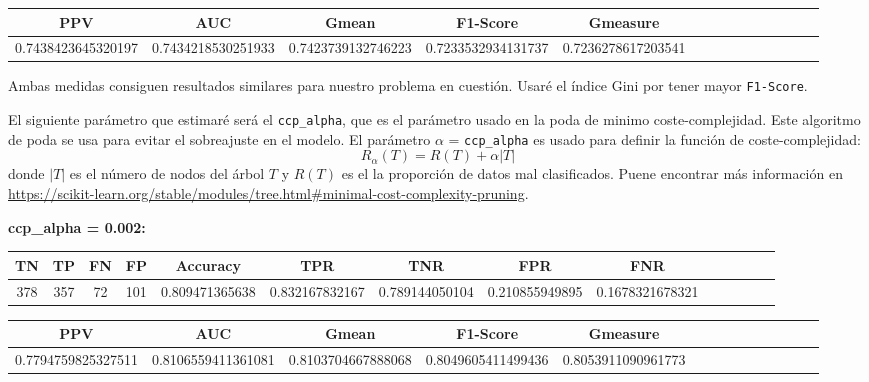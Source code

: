 \documentclass[a4]{article}
\begin{document}
\begin{center}
\begin{tabular}{|c|c|c|c|c|c|c|c|c|c|c|c|c|c|}
\hline
\multicolumn{1}{|c|}{\textbf{PPV}} & \textbf{AUC} & \textbf{Gmean} & \textbf{F1-Score} & \textbf{Gmeasure}  \\ \hline
  0.7438423645320197 & 0.7434218530251933 & 0.7423739132746223 & 0.7233532934131737 & 0.7236278617203541 \\ \hline
\end{tabular}
\end{center}

Ambas medidas consiguen resultados similares para nuestro problema en cuestión. Usaré el índice Gini por tener mayor \texttt{F1-Score}.

El siguiente parámetro que estimaré será el \texttt{ccp\_alpha}, que es el parámetro usado en la poda de minimo coste-complejidad. Este algoritmo de poda se usa para evitar el sobreajuste en el modelo. El parámetro $\alpha$ = \texttt{ccp\_alpha} es usado para definir la función de coste-complejidad:
\[R_{\alpha}(T) = R(T) + \alpha|T|\] donde $|T|$ es el número de nodos del árbol $T$ y $R(T)$ es el la proporción de datos mal clasificados. Puene encontrar más información en \href{https://scikit-learn.org/stable/modules/tree.html\#minimal-cost-complexity-pruning}{https://scikit-learn.org/stable/modules/tree.html\#minimal-cost-complexity-pruning}.


\textbf{ccp\_alpha = 0.002:}
\begin{center}
\begin{tabular}{|c|c|c|c|c|c|c|c|c|c|c|c|c|c|}
\hline
\multicolumn{1}{|c|}{\textbf{TN}}& \textbf{TP} & \textbf{FN} & \textbf{FP} & \textbf{Accuracy} & \textbf{TPR} & \textbf{TNR} & \textbf{FPR} &\textbf{FNR} \\ \hline
  378 & 357 & 72 & 101 & 0.809471365638 & 0.832167832167 & 0.789144050104 & 0.210855949895 & 0.1678321678321 \\ \hline
\end{tabular}
\end{center}

\begin{center}
\begin{tabular}{|c|c|c|c|c|c|c|c|c|c|c|c|c|c|}
\hline
\multicolumn{1}{|c|}{\textbf{PPV}} & \textbf{AUC} & \textbf{Gmean} & \textbf{F1-Score} & \textbf{Gmeasure}  \\ \hline
  0.7794759825327511 & 0.8106559411361081 & 0.8103704667888068 & 0.8049605411499436 & 0.8053911090961773 \\ \hline
\end{tabular}
\end{center}
\end{document}
